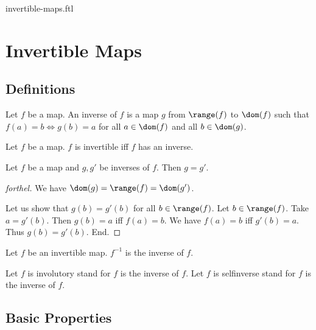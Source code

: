 \documentclass{naproche-library}
\begin{document}
\begin{smodule}{invertible-maps.ftl}

  \section*{Invertible Maps}

  \subsection*{Definitions}

  \begin{definition}[forthel,id=FOUNDATIONS_09_7776974319648768,printid]
    Let $f$ be a map.
    An inverse of $f$ is a map $g$ from $\range(f)$ to $\dom(f)$ such that $f(a) = b \iff g(b) = a$ for all $a \in \dom(f)$ and all $b \in \dom(g)$.
  \end{definition}

  \begin{definition}[forthel,id=FOUNDATIONS_09_3430350086733824,printid]
    Let $f$ be a map.
    $f$ is invertible iff $f$ has an inverse.
  \end{definition}

  \begin{lemma}[forthel,id=FOUNDATIONS_09_5108611793551360,printid]
    Let $f$ be a map and $g, g'$ be inverses of $f$.
    Then $g = g'$.
  \end{lemma}
  \begin{proof}[forthel]
    We have $\dom(g) = \range(f) = \dom(g')$.

    Let us show that $g(b) = g'(b)$ for all $b \in \range(f)$.
      Let $b \in \range(f)$.
      Take $a = g'(b)$.
      Then $g(b) = a$ iff $f(a) = b$.
      We have $f(a) = b$ iff $g'(b) = a$.
      Thus $g(b) = g'(b)$.
    End.
  \end{proof}

  \begin{definition}[forthel,id=FOUNDATIONS_09_6458627204317184,printid]
    Let $f$ be an invertible map.
    $f^{-1}$ is the inverse of $f$.

    Let $f$ is involutory stand for $f$ is the inverse of $f$.
    Let $f$ is selfinverse stand for $f$ is the inverse of $f$.
  \end{definition}


  \subsection*{Basic Properties}


\end{smodule}
\end{document}
